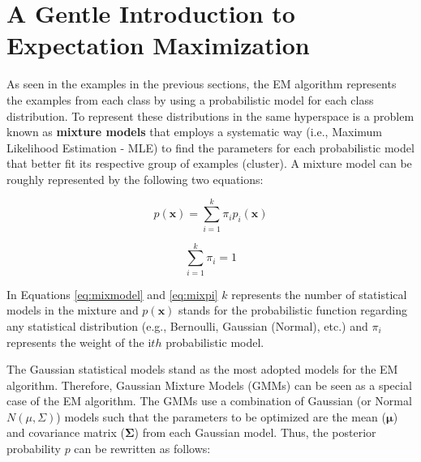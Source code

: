 

\section{A Gentle Introduction to Expectation Maximization}

As seen in the examples in the previous sections, the EM algorithm represents the examples from each class by using a probabilistic model for each class distribution. To represent these distributions in the same hyperspace is a problem known as \textbf{mixture models} that employs a systematic way (i.e., Maximum Likelihood Estimation - MLE) to find the parameters for each probabilistic model that better fit its respective group of examples (cluster). A mixture model can be roughly represented by the following two equations:

\begin{equation}
    p(\mathbf{x}) = \sum_{i = 1}^{k} \pi_{i} p_{i}(\mathbf{x}) 
    \label{eq:mixmodel}
\end{equation}

\begin{equation}
    \sum_{i = 1}^{k} \pi_{i} = 1
    \label{eq:mixpi}
\end{equation}

In Equations \ref{eq:mixmodel} and \ref{eq:mixpi} $k$ represents the number of statistical models in the mixture and $p(\mathbf{x})$ stands for the probabilistic function regarding any statistical distribution (e.g., Bernoulli, Gaussian (Normal), etc.) and $\pi_i$ represents the weight of the i$th$ probabilistic model.


The Gaussian statistical models stand as the most adopted models for the EM algorithm. Therefore, Gaussian Mixture Models (GMMs) \cite{richardson1997bayesian} can be seen as a special case of the EM algorithm. %
The GMMs use a combination of Gaussian (or Normal $N(\mu, \Sigma)$) models such that the parameters to be optimized are the mean ($\bm{\mu}$) and covariance matrix ($\bm{\Sigma}$) from each Gaussian model. Thus, the posterior probability $p$ can be rewritten as follows: 

